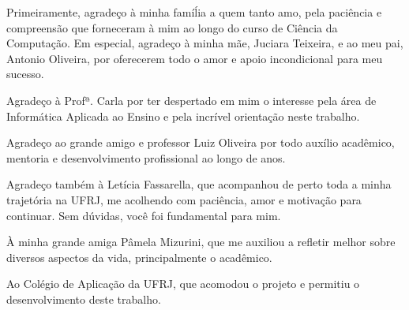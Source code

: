 Primeiramente, agradeço à minha famíĺia a quem tanto amo, pela paciência e compreensão que forneceram à mim ao longo do curso de Ciência da Computação. Em especial, agradeço à minha mãe, Juciara Teixeira, e ao meu pai, Antonio Oliveira, por oferecerem todo o amor e apoio incondicional para meu sucesso.

Agradeço à Profª. Carla por ter despertado em mim o interesse pela área de Informática Aplicada ao Ensino e pela incrível orientação neste trabalho.

Agradeço ao grande amigo e professor Luiz Oliveira por todo auxílio acadêmico, mentoria e desenvolvimento profissional ao longo de anos.

Agradeço também à Letícia Fassarella, que acompanhou de perto toda a minha trajetória na UFRJ, me acolhendo com paciência, amor e motivação para continuar. Sem dúvidas, você foi fundamental para mim.

À minha grande amiga Pâmela Mizurini, que me auxiliou a refletir melhor sobre diversos aspectos da vida, principalmente o acadêmico.

Ao Colégio de Aplicação da UFRJ, que acomodou o projeto e permitiu o desenvolvimento deste trabalho.